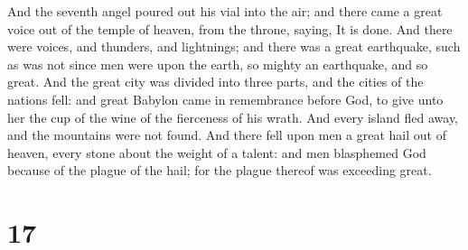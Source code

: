 And the seventh angel poured out his vial into the air;
and there came a great voice out of the temple of heaven, from the
throne, saying, It is done.  And there were voices, and
thunders, and lightnings; and there was a great earthquake, such as was
not since men were upon the earth, so mighty an earthquake, and so
great.  And the great city was divided into three parts,
and the cities of the nations fell: and great Babylon came in
remembrance before God, to give unto her the cup of the wine of the
fierceness of his wrath.  And every island fled away, and
the mountains were not found.  And there fell upon men a
great hail out of heaven, every stone about the weight of a talent: and
men blasphemed God because of the plague of the hail; for the plague
thereof was exceeding great.

\hypertarget{section-16}{%
\section{17}\label{section-16}}

